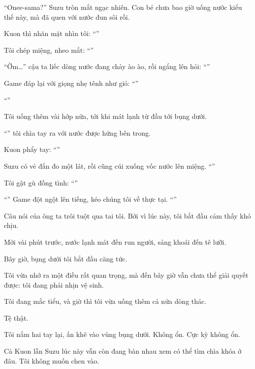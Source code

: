 \documentclass[../main.tex]{subfiles}
\begin{document}
``Onee-sama?'' Suzu tròn mắt ngạc nhiên. Con bé chưa bao giờ uống nước kiểu thế này, mà đã quen với nước đun sôi rồi.

Kuon thì nhăn mặt nhìn tôi: ``''

Tôi chép miệng, nheo mắt: ``''

``Ờm\dots'' cậu ta liếc dòng nước đang chảy ào ào, rồi ngẩng lên hỏi: ``''

Game đáp lại với giọng nhẹ tênh như gió: ``''

``''

Tôi uống thêm vài hớp nữa, tới khi mát lạnh từ đầu tới bụng dưới.

``'' tôi chìa tay ra với nước được hứng bên trong.

Kuon phẩy tay: ``''

Suzu có vẻ đắn đo một lát, rồi cũng cúi xuống vốc nước lên miệng. ``''

Tôi gật gù đồng tình: ``''

``'' Game đột ngột lên tiếng, kéo chúng tôi về thực tại. ``''

\il

Câu nói của ông ta trôi tuột qua tai tôi. Bởi vì lúc này, tôi bắt đầu cảm thấy khó chịu.

Mới vài phút trước, nước lạnh mát đến run người, sảng khoái đến tê lưỡi.

Bây giờ, bụng dưới tôi bắt đầu căng tức.

Tôi vừa nhớ ra một điều rất quan trọng, mà đến bây giờ vẫn chưa thể giải quyết được: tôi đang phải nhịn vệ sinh.

Tôi đang mắc tiểu, và giờ thì tôi vừa uống thêm cả nửa dòng thác.

Tệ thật.

Tôi nắm hai tay lại, ấn khẽ vào vùng bụng dưới. Không ổn. Cực kỳ không ổn.

Cả Kuon lẫn Suzu lúc này vẫn còn đang bàn nhau xem có thể tìm chìa khóa ở đâu. Tôi không muốn chen vào.
\end{document}
